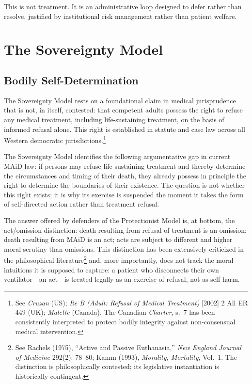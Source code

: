 \documentclass[11pt, letterpaper]{article}
\begin{document}
This is not treatment. It is an administrative loop designed to defer rather than
resolve, justified by institutional risk management rather than patient welfare.

\section{The Sovereignty Model}

\subsection{Bodily Self-Determination}

The Sovereignty Model rests on a foundational claim in medical jurisprudence that is
not, in itself, contested: that competent adults possess the right to refuse any
medical treatment, including life-sustaining treatment, on the basis of informed
refusal alone. This right is established in statute and case law across all Western
democratic jurisdictions.\footnote{%
  See \textit{Cruzan} (US); \textit{Re B (Adult: Refusal of Medical Treatment)}
  [2002] 2 All ER 449 (UK); \textit{Malette} (Canada). The Canadian \textit{Charter},
  s.\ 7 has been consistently interpreted to protect bodily integrity against
  non-consensual medical intervention.}

The Sovereignty Model identifies the following argumentative gap in current MAiD law:
if persons may refuse life-sustaining treatment and thereby determine the
circumstances and timing of their death, they already possess in principle the right
to determine the boundaries of their existence. The question is not whether this right
exists; it is why its exercise is suspended the moment it takes the form of
self-directed action rather than treatment refusal.

The answer offered by defenders of the Protectionist Model is, at bottom, the
act/omission distinction: death resulting from refusal of treatment is an omission;
death resulting from MAiD is an act; acts are subject to different and higher moral
scrutiny than omissions. This distinction has been extensively criticized in the
philosophical literature\footnote{%
  See Rachels (1975), ``Active and Passive Euthanasia,''
  \textit{New England Journal of Medicine} 292(2): 78--80; Kamm (1993),
  \textit{Morality, Mortality}, Vol.\ 1. The distinction is philosophically
  contested; its legislative instantiation is historically contingent.}
and, more importantly, does not track the moral intuitions it is supposed to capture:
a patient who disconnects their own ventilator---an act---is treated legally as an
exercise of refusal, not as self-harm.
\end{document}
